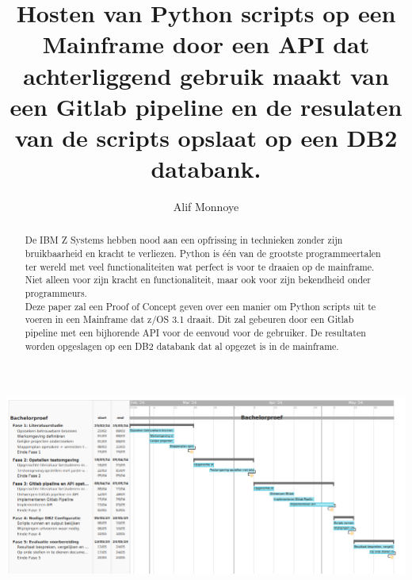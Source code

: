 \documentclass{hogent-article}
\title{Hosten van Python scripts op een Mainframe door een API dat achterliggend gebruik maakt van een Gitlab pipeline en de resulaten van de scripts opslaat op een DB2 databank.}
\author{Alif Monnoye}
\begin{document}
\begin{abstract}
  De IBM Z Systems hebben nood aan een opfrissing in technieken zonder zijn bruikbaarheid en kracht te verliezen. Python is één van de grootste programmeertalen ter wereld met veel functionaliteiten wat perfect is voor te draaien op de mainframe. Niet alleen voor zijn kracht en functionaliteit, maar ook voor zijn bekendheid onder programmeurs. \\
  Deze paper zal een Proof of Concept geven over een manier om Python scripts uit te voeren in een Mainframe dat z/OS 3.1 draait. Dit zal gebeuren door een Gitlab pipeline met een bijhorende API voor de eenvoud voor de gebruiker. De resultaten worden opgeslagen op een DB2 databank dat al opgezet is in de mainframe.
\end{abstract}

\tableofcontents



\printbibliography[heading=bibintoc]

\cleardoublepage
\begin{center}%
    \centering
    \includegraphics[width=550pt]{ScreenshotGantt.png}
\end{center}
\end{document}
